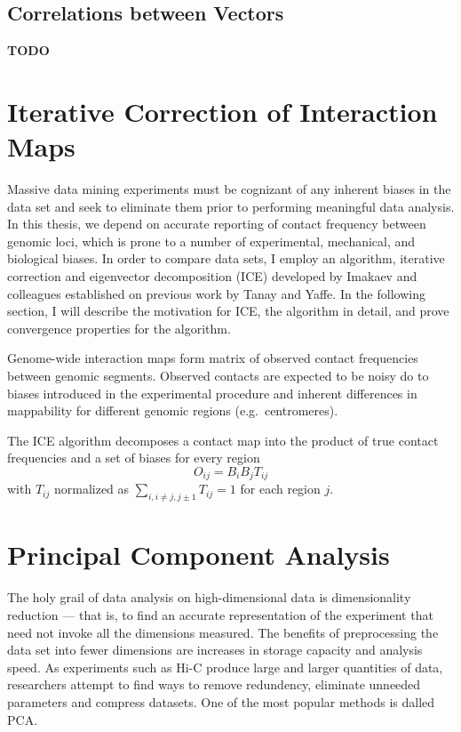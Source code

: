 \subsection*{Correlations between Vectors}

\textbf{TODO}

\section*{Iterative Correction of Interaction Maps}

Massive data mining experiments must be cognizant of any inherent biases in the data set and seek to eliminate them prior to performing
meaningful data analysis.  In this thesis, we depend on accurate reporting of contact frequency between genomic loci, which is prone
to a number of experimental, mechanical, and biological biases\cite{dekker2006}.  In order to compare data sets, I employ an algorithm,
iterative correction and eigenvector decomposition (ICE) developed by Imakaev and colleagues\cite{imakaev2012} established on previous
work by Tanay and Yaffe\cite{yaffe2011}.  In the following section, I will describe the motivation for ICE, the algorithm in detail, and
prove convergence properties for the algorithm.

Genome-wide interaction maps form matrix of observed contact frequencies between genomic segments.  Observed contacts are expected to
be noisy do to biases introduced in the experimental procedure and inherent differences in mappability for different genomic regions
(e.g.\ centromeres).


The ICE algorithm decomposes a contact map into the product of true contact frequencies and a set of biases for every region
\[
  O_{ij} = B_{i}B_{j}T_{ij}
\]
with $T_{ij}$ normalized as $\sum_{i,i \neq j,j \pm 1}T_{ij} = 1$ for each region $j$.




\section*{Principal Component Analysis}

The holy grail of data analysis on high-dimensional data is dimensionality reduction --- that is, to find an accurate representation of
the experiment that need not invoke all the dimensions measured.  The benefits of preprocessing the data set into fewer dimensions are
increases in storage capacity and analysis speed.  As experiments such as Hi-C produce large and larger quantities of data, researchers
attempt to find ways to remove redundency, eliminate unneeded parameters and compress datasets.  One of the most popular methods is
dalled \gls{PCA}\cite{law1987}.

